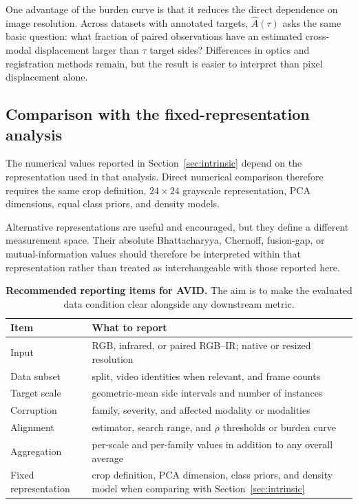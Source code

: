 \documentclass[10pt]{article}
\newcommand{\dataset}{\textsc{AVID}}
\begin{document}
One advantage of the burden curve is that it reduces the direct dependence on image resolution. Across datasets with annotated targets, $\widehat A(\tau)$ asks the same basic question: what fraction of paired observations have an estimated cross-modal displacement larger than $\tau$ target sides? Differences in optics and registration methods remain, but the result is easier to interpret than pixel displacement alone.

\subsection{Comparison with the fixed-representation analysis}

The numerical values reported in Section~\ref{sec:intrinsic} depend on the representation used in that analysis. Direct numerical comparison therefore requires the same crop definition, $24\times24$ grayscale representation, PCA dimensions, equal class priors, and density models.

Alternative representations are useful and encouraged, but they define a different measurement space. Their absolute Bhattacharyya, Chernoff, fusion-gap, or mutual-information values should therefore be interpreted within that representation rather than treated as interchangeable with those reported here.

\begin{table}[t]
\centering
\caption{\textbf{Recommended reporting items for \dataset{}.}
The aim is to make the evaluated data condition clear alongside any downstream metric.}
\label{tab:reporting}
\small
\begin{tabularx}{\linewidth}{@{}l X@{}}
\toprule
Item & What to report \\
\midrule
Input
& RGB, infrared, or paired RGB--IR; native or resized resolution \\

Data subset
& split, video identities when relevant, and frame counts \\

Target scale
& geometric-mean side intervals and number of instances \\

Corruption
& family, severity, and affected modality or modalities \\

Alignment
& estimator, search range, and $\rho$ thresholds or burden curve \\

Aggregation
& per-scale and per-family values in addition to any overall average \\

Fixed representation
& crop definition, PCA dimension, class priors, and density model when comparing with Section~\ref{sec:intrinsic} \\
\bottomrule
\end{tabularx}
\end{table}
\end{document}
